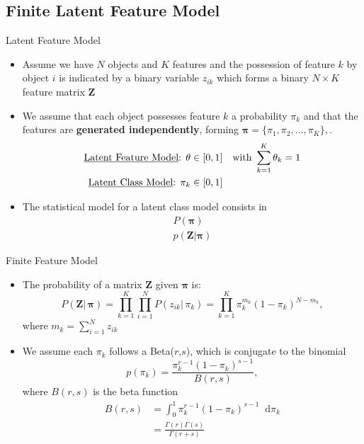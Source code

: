 \documentclass[aspectratio=169,xcolor=dvipsnames]{beamer}
\newcommand*\diff{\mathop{}\!\mathrm{d}}
\newcommand{\vecpi}{\boldsymbol{\pi}}
\newcommand{\matz}{\textbf{Z}}
\begin{document}
\subsection{Finite Latent Feature Model}
\begin{frame}{Latent Feature Model}
\setlength{\leftmargini}{0.2cm}
\begin{itemize}[<+->]
\item Assume we have $N$ objects and $K$ features and the possession of feature $k$ by object $i$ is indicated by a binary variable $z_{ik}$ which forms a binary $N \times K$ feature matrix $\matz$ 
\item We assume that each object possesses feature $k$ a probability $\pi_k$ and that
the features are \textbf{generated independently}, forming $\vecpi = \{\pi_1,\pi_2,\dots,\pi_K\},$.
\begin{align*}
    \text{\underline{Latent Feature Model}: } \theta &\in [0,1] \quad \text{with }\sum_{k=1}^{K} \theta_k=1 \\
    \text{\underline{Latent Class Model}: } \pi_k &\in [0,1]
\end{align*}
\item The statistical model for a latent class model consists in
\begin{gather*}
  P(\vecpi) \\
  p(\matz|\vecpi)   
\end{gather*}
\end{itemize}
\end{frame}
\begin{frame}{Finite Feature Model}
\setlength{\leftmargini}{0.2cm}
\begin{itemize}[<+->]
\item The probability of a matrix $\matz$ given $\vecpi$ is:
\begin{equation*}
    P(\matz | \, \vecpi) = \prod_{k=1}^{K}\prod_{i=1}^{N}P(z_{ik}|\, \pi_{k})=\prod_{k=1}^{K}\pi_{k}^{m_k}(1-\pi_{k})^{N-m_k},
\end{equation*}
where $m_k=\sum_{i=1}^{N}z_{ik}$
\item We assume each $\pi_k$ follows a Beta($r$,$s$), which is conjugate to the binomial
\begin{equation*}
    p(\pi_k) = \frac{\pi_k^{r-1}(1-\pi_k)^{s-1}}{B(r,s)},
\end{equation*}
where $B(r,s)$ is the beta function
\begin{align*}
    B(r,s) &= \int_{0}^{1}\pi_k^{r-1}(1-\pi_k)^{s-1} \diff \pi_k \\
    &= \frac{\Gamma(r)\Gamma(s)}{\Gamma(r+s)}
\end{align*}
\end{itemize}
\end{frame}
\end{document}
